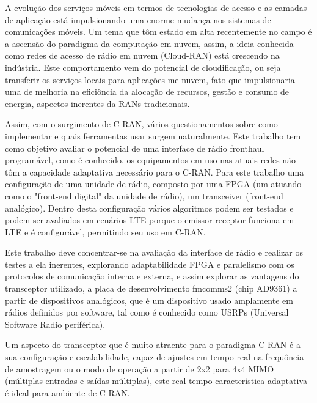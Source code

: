 \documentclass{ufpatcc}
\begin{document}
\tableofcontents    \clearpage


\begin{ufpaResumo}

A evolu\c{c}\~{a}o dos servi\c{c}os m\'{o}veis em termos de tecnologias de acesso e as camadas
de aplica\c{c}\~{a}o est\'{a} impulsionando uma enorme mudan\c{c}a nos sistemas de comunica\c{c}ões
m\'{o}veis. Um tema que t\^{o}m estado em alta recentemente no campo \'{e} a ascens\~{a}o do
paradigma da computa\c{c}\~{a}o em nuvem, assim, a ideia conhecida como redes de acesso
de r\'{a}dio em nuvem (Cloud-RAN) est\'{a} crescendo na ind\'{u}stria. Este comportamento
vem do potencial de cloudifica\c{c}\~{a}o, ou seja transferir os servi\c{c}os locais para
aplica\c{c}ões me nuvem, fato que impulsionaria uma de melhoria na efici\^{o}ncia da
aloca\c{c}\~{a}o de recursos, gest\~{a}o e consumo de energia, aspectos inerentes da RANs
tradicionais.

Assim, com o surgimento de C-RAN, v\'{a}rios questionamentos sobre como implementar
e quais ferramentas usar surgem naturalmente. Este trabalho tem como objetivo
avaliar o potencial de uma interface de r\'{a}dio fronthaul program\'{a}vel, como \'{e}
conhecido, os equipamentos em uso nas atuais redes n\~{a}o t\^{o}m a capacidade
adaptativa necess\'{a}rio para o C-RAN. Para este trabalho uma configura\c{c}\~{a}o de uma
unidade de r\'{a}dio, composto por uma FPGA (um atuando como o "front-end digital"
da unidade de r\'{a}dio), um transceiver (front-end anal\'{o}gico). Dentro desta
configura\c{c}\~{a}o v\'{a}rios algoritmos podem ser testados e podem ser avaliados em
cen\'{a}rios LTE porque o emissor-receptor funciona em LTE e \'{e} configur\'{a}vel,
permitindo seu uso em C-RAN.

Este trabalho deve concentrar-se na avalia\c{c}\~{a}o da interface de r\'{a}dio e realizar
os testes a ela inerentes, explorando adaptabilidade FPGA e paralelismo com os
protocolos de comunica\c{c}\~{a}o interna e externa, e assim explorar as vantagens do
transceptor utilizado, a placa de desenvolvimento fmcomms2 (chip AD9361) a
partir de dispositivos anal\'{o}gicos, que \'{e} um dispositivo usado amplamente em
r\'{a}dios definidos por software, tal como \'{e} conhecido como USRPs (Universal
Software Radio perif\'{e}rica).

Um aspecto do transceptor que \'{e} muito atraente para o paradigma C-RAN \'{e} a sua
configura\c{c}\~{a}o e escalabilidade, capaz de ajustes em tempo real na frequ\^{o}ncia de
amostragem ou o modo de opera\c{c}\~{a}o a partir de 2x2 para 4x4 MIMO (m\'{u}ltiplas
entradas e sa\'{i}das m\'{u}ltiplas), este real tempo caracter\'{i}stica adaptativa \'{e} ideal
para ambiente de C-RAN.


\end{ufpaResumo}
\end{document}
